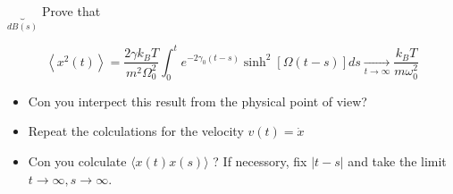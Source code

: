 $\underbrace{}_{d B(s)}$
Prove that

$$ \left\langle x^{2}(t)\right\rangle=\frac{2 \gamma k_{B} T}{m^{2} \Omega_{0}^{2}} \int_{0}^{t} e^{-2 \gamma_{0}(t-s)} \sinh ^{2}[\Omega(t-s)] d s \underset{t \rightarrow \infty}{\longrightarrow} \frac{k_{B} T}{m \omega_{0}^{2}} $$

\begin{itemize}
  \item Con you interpect this result from the physical point of view?
  \item Repeat the colculations for the velocity $v(t)=\dot{x}$
  \item Con you colculate $\langle x(t) x(s)\rangle$ ? If necessory, fix $|t-s|$ and take the limit $t \rightarrow \infty, s \rightarrow \infty$.
\end{itemize}
